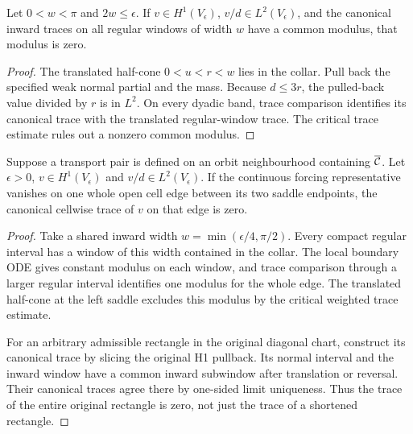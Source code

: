 \begin{lemma}
\label{lem:edge-corner-mode-exclusion}
\leanok
Let $0<w<\pi$ and $2w\le\epsilon$. If $v\in H^1(V_\epsilon)$,
$v/d\in L^2(V_\epsilon)$, and the canonical inward traces on all regular
windows of width $w$ have a common modulus, that modulus is zero.
\end{lemma}
\begin{proof}
\leanok
The translated half-cone $0<u<r<w$ lies in the collar. Pull back the
specified weak normal partial and the mass. Because $d\le3r$, the
pulled-back value divided by $r$ is in $L^2$.
On every dyadic band, trace comparison identifies its canonical trace with
the translated regular-window trace. The critical trace estimate rules
out a nonzero common modulus.
\end{proof}

\begin{lemma}
\label{lem:transport-zero-edge-trace}
\leanok
Suppose a transport pair is defined on an orbit neighbourhood containing
$\overline{\mathcal{C}}$. Let $\epsilon>0$, $v\in H^1(V_\epsilon)$ and
$v/d\in L^2(V_\epsilon)$. If the continuous forcing representative vanishes
on one whole open cell edge between its two saddle endpoints, the canonical
cellwise trace of $v$ on that edge is zero.
\end{lemma}

\begin{proof}
\leanok
Take a shared inward width $w=\min(\epsilon/4,\pi/2)$.
Every compact regular interval has a window of this width contained in the
collar. The local boundary ODE gives constant modulus on each window,
and trace comparison through a larger regular interval identifies one
modulus for the whole edge. The translated half-cone at the left saddle
excludes this modulus by the critical weighted trace estimate.

For an arbitrary admissible rectangle in the original diagonal chart,
construct its canonical trace by slicing the original H1 pullback.
Its normal interval and the inward window have a common inward
subwindow after translation or reversal. Their canonical traces agree there
by one-sided limit uniqueness. Thus the trace of the entire original
rectangle is zero, not just the trace of a shortened rectangle.
\end{proof}

